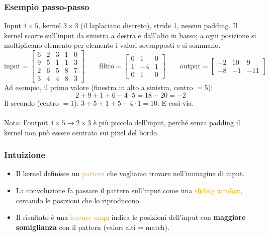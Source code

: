 \documentclass[a4paper,12pt]{article}
\newcommand{\hl}[1]{\textcolor{orange}{#1}}
\begin{document}
\subsubsection{Esempio passo-passo}
Input $4\times5$, kernel $3\times3$ (il laplaciano discreto), stride 1, nessun padding. Il kernel scorre sull'input da sinistra a destra e dall'alto in basso; a ogni posizione si moltiplicano elemento per elemento i valori sovrapposti e si sommano.
\[
\text{input}=\begin{bmatrix}
6&2&3&1&0\\
9&5&1&1&3\\
2&6&5&8&7\\
3&4&4&8&3
\end{bmatrix}
\qquad
\text{filtro}=\begin{bmatrix}
0&1&0\\
1&-4&1\\
0&1&0
\end{bmatrix}
\qquad
\text{output}=\begin{bmatrix}
-2&10&9\\
-8&-1&-11
\end{bmatrix}
\]
Ad esempio, il primo valore (finestra in alto a sinistra, centro $=5$):
\[
2 + 9 + 1 + 6 - 4\cdot5 = 18 - 20 = -2
\]
Il secondo (centro $=1$): $3+5+1+5-4\cdot1 = 10$. E così via.\\
\vspace{1px}\\
Nota: l'output $4\times5 \to 2\times3$ è più piccolo dell'input, perché senza padding il kernel non può essere centrato sui pixel del bordo.

\subsubsection{Intuizione}
\begin{itemize}
\item Il kernel definisce un \hl{pattern} che vogliamo trovare nell'immagine di input.
\item La convoluzione fa passare il pattern sull'input come una \hl{sliding window}, cercando le posizioni che lo riproducono.
\item Il risultato è una \hl{feature map}: indica le posizioni dell'input con \textbf{maggiore somiglianza} con il pattern (valori alti = match).
\end{itemize}
\end{document}
